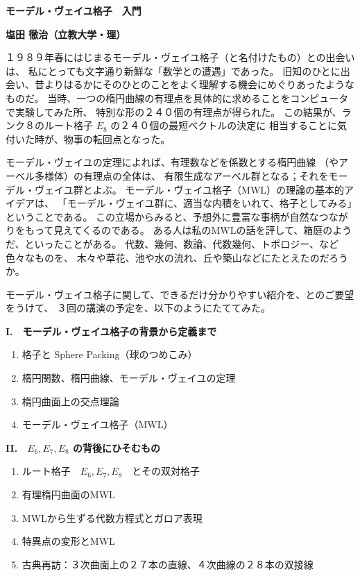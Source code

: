 \documentclass[uplatex,dvipdfmx]{jlreq}
\begin{document}
\noindent
{\large\bfseries モーデル・ヴェイユ格子　入門}

\medskip
\noindent
{\large\bfseries \hfill 塩田 徹治（立教大学・理）}

\bigskip\bigskip

１９８９年春にはじまるモーデル・ヴェイユ格子（と名付けたもの）との出会いは、
私にとっても文字通り新鮮な「数学との遭遇」であった。
旧知のひとに出会い、昔よりはるかにそのひとのことをよく理解する機会にめぐりあったようなものだ。
当時、一つの楕円曲線の有理点を具体的に求めることをコンピュータで実験してみた所、
特別な形の２４０個の有理点が得られた。
この結果が、ランク８のルート格子 $E_8$ の２４０個の最短ベクトルの決定に
相当することに気付いた時が、物事の転回点となった。

\bigskip

モーデル・ヴェイユの定理によれば、有理数などを係数とする楕円曲線
（やアーベル多様体）の有理点の全体は、
有限生成なアーベル群となる；それをモーデル・ヴェイユ群とよぶ。
モーデル・ヴェイユ格子（MWL）の理論の基本的アイデアは、
「モーデル・ヴェイユ群に、適当な内積をいれて、格子としてみる」ということである。
この立場からみると、予想外に豊富な事柄が自然なつながりをもって見えてくるのである。
ある人は私のMWLの話を評して、箱庭のようだ、といったことがある。
代数、幾何、数論、代数幾何、トポロジー、など色々なものを、
木々や草花、池や水の流れ、丘や築山などにたとえたのだろうか。

\bigskip

モーデル・ヴェイユ格子に関して、できるだけ分かりやすい紹介を、とのご要望をうけて、
３回の講演の予定を、以下のようにたててみた。

\bigskip\bigskip

\noindent\textbf{I\@.　モーデル・ヴェイユ格子の背景から定義まで}
\begin{enumerate}
  \setlength{\itemsep}{0pt}
  \item 格子と Sphere Packing（球のつめこみ）
  \item 楕円関数、楕円曲線、モーデル・ヴェイユの定理
  \item 楕円曲面上の交点理論
  \item モーデル・ヴェイユ格子（MWL）
\end{enumerate}

\bigskip

\noindent\textbf{II\@.　$E_6, E_7, E_8$ の背後にひそむもの}
\begin{enumerate}
  \setlength{\itemsep}{0pt}
  \item ルート格子　$E_6, E_7, E_8$　とその双対格子
  \item 有理楕円曲面のMWL
  \item MWLから生ずる代数方程式とガロア表現
  \item 特異点の変形とMWL
  \item 古典再訪：３次曲面上の２７本の直線、４次曲線の２８本の双接線
\end{enumerate}
\end{document}
